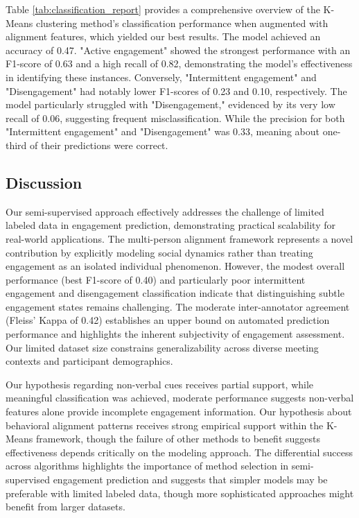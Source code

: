 \documentclass[
]{ceurart}
\begin{document}
Table \ref{tab:classification_report} provides a comprehensive overview of the K-Means clustering method's classification performance when augmented with alignment features, which yielded our best results. The model achieved an accuracy of 0.47. "Active engagement" showed the strongest performance with an F1-score of 0.63 and a high recall of 0.82, demonstrating the model's effectiveness in identifying these instances. Conversely, "Intermittent engagement" and "Disengagement" had notably lower F1-scores of 0.23 and 0.10, respectively. The model particularly struggled with "Disengagement," evidenced by its very low recall of 0.06, suggesting frequent misclassification. While the precision for both "Intermittent engagement" and "Disengagement" was 0.33, meaning about one-third of their predictions were correct.

\subsection{Discussion}


Our semi-supervised approach effectively addresses the challenge of limited labeled data in engagement prediction, demonstrating practical scalability for real-world applications. The multi-person alignment framework represents a novel contribution by explicitly modeling social dynamics rather than treating engagement as an isolated individual phenomenon.
However, the modest overall performance (best F1-score of 0.40) and particularly poor intermittent engagement and disengagement classification indicate that distinguishing subtle engagement states remains challenging. The moderate inter-annotator agreement (Fleiss' Kappa of 0.42) establishes an upper bound on automated prediction performance and highlights the inherent subjectivity of engagement assessment. Our limited dataset size constrains generalizability across diverse meeting contexts and participant demographics.

Our hypothesis regarding non-verbal cues receives partial support, while meaningful classification was achieved, moderate performance suggests non-verbal features alone provide incomplete engagement information. Our hypothesis about behavioral alignment patterns receives strong empirical support within the K-Means framework, though the failure of other methods to benefit suggests effectiveness depends critically on the modeling approach.
The differential success across algorithms highlights the importance of method selection in semi-supervised engagement prediction and suggests that simpler models may be preferable with limited labeled data, though more sophisticated approaches might benefit from larger datasets. 
\end{document}
